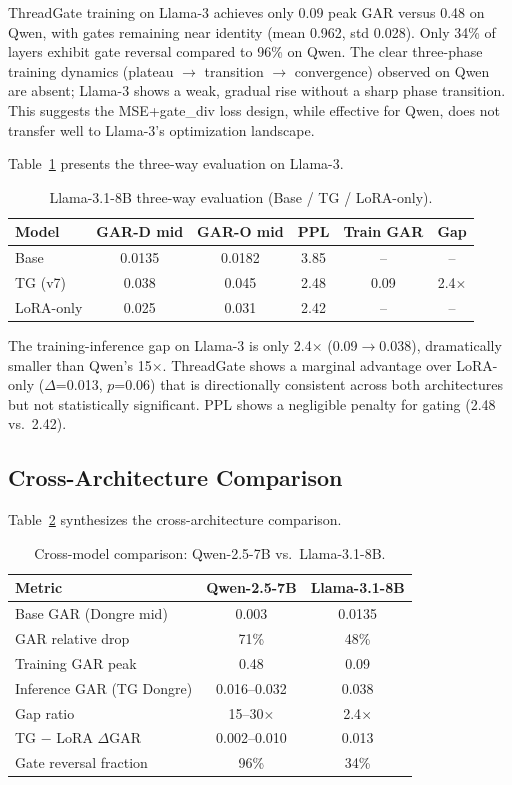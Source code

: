\documentclass[11pt,a4paper]{article}
\begin{document}
ThreadGate training on Llama-3 achieves only 0.09 peak GAR versus 0.48 on Qwen, with gates remaining near identity (mean 0.962, std 0.028). Only 34\% of layers exhibit gate reversal compared to 96\% on Qwen. The clear three-phase training dynamics (plateau $\to$ transition $\to$ convergence) observed on Qwen are absent; Llama-3 shows a weak, gradual rise without a sharp phase transition. This suggests the MSE+gate\_div loss design, while effective for Qwen, does not transfer well to Llama-3's optimization landscape.

Table~\ref{tab:llama_eval} presents the three-way evaluation on Llama-3.

\begin{table}[h]
\centering
\caption{Llama-3.1-8B three-way evaluation (Base / TG / LoRA-only).}
\label{tab:llama_eval}
\begin{tabular}{lccccc}
\toprule
Model & GAR-D mid & GAR-O mid & PPL & Train GAR & Gap \\
\midrule
Base       & 0.0135 & 0.0182 & 3.85 & --   & -- \\
TG (v7)    & 0.038  & 0.045  & 2.48 & 0.09 & 2.4$\times$ \\
LoRA-only  & 0.025  & 0.031  & 2.42 & --   & -- \\
\bottomrule
\end{tabular}
\end{table}

The training-inference gap on Llama-3 is only 2.4$\times$ (0.09$\to$0.038), dramatically smaller than Qwen's 15$\times$. ThreadGate shows a marginal advantage over LoRA-only ($\Delta$=0.013, $p$=0.06) that is directionally consistent across both architectures but not statistically significant. PPL shows a negligible penalty for gating (2.48 vs.\ 2.42).

\subsection{Cross-Architecture Comparison}

Table~\ref{tab:crossmodel} synthesizes the cross-architecture comparison.

\begin{table}[h]
\centering
\caption{Cross-model comparison: Qwen-2.5-7B vs.\ Llama-3.1-8B.}
\label{tab:crossmodel}
\begin{tabular}{lcc}
\toprule
Metric & Qwen-2.5-7B & Llama-3.1-8B \\
\midrule
Base GAR (Dongre mid)     & 0.003        & 0.0135 \\
GAR relative drop         & 71\%         & 48\% \\
Training GAR peak         & 0.48         & 0.09 \\
Inference GAR (TG Dongre) & 0.016--0.032 & 0.038 \\
Gap ratio                 & 15--30$\times$     & 2.4$\times$ \\
TG $-$ LoRA $\Delta$GAR   & 0.002--0.010 & 0.013 \\
Gate reversal fraction    & 96\%         & 34\% \\
\bottomrule
\end{tabular}
\end{table}
\end{document}
